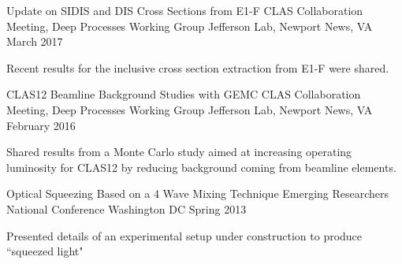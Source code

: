 

\begin{cventries}

  \cventry
    {Update on SIDIS and DIS Cross Sections from E1-F} %
    {CLAS Collaboration Meeting, Deep Processes Working Group} %
    {Jefferson Lab, Newport News, VA} %
    {March 2017} %
    {
      \begin{cvitems} %
        \item {Recent results for the inclusive cross section extraction from E1-F were shared.}
      \end{cvitems}
    }

  \cventry
    {CLAS12 Beamline Background Studies with GEMC} %
    {CLAS Collaboration Meeting, Deep Processes Working Group} %
    {Jefferson Lab, Newport News, VA} %
    {February 2016} %
    {
      \begin{cvitems} %
        \item {Shared results from a Monte Carlo study aimed at increasing operating luminosity for CLAS12 by reducing background coming from beamline elements.}
      \end{cvitems}
    }

  \cventry
    {Optical Squeezing Based on a 4 Wave Mixing Technique } %
    {Emerging Researchers National Conference} %
    {Washington DC} %
    {Spring 2013} %
    {
      \begin{cvitems} %
        \item {Presented details of an experimental setup under construction to produce ``squeezed light"}
      \end{cvitems}
    }

\end{cventries}
